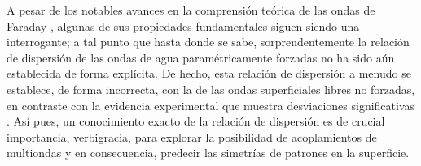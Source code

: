 A pesar de los notables avances en la comprensión teórica de las ondas de Faraday \cite{miles1999faraday, mancebo2004standing}, algunas de sus propiedades fundamentales siguen siendo una interrogante; a tal punto que hasta donde se sabe, sorprendentemente la relación de dispersión de las ondas de agua paramétricamente forzadas no ha sido aún establecida de forma explícita. De hecho, esta relación de dispersión a menudo se establece, de forma incorrecta, con la de las ondas superficiales libres no forzadas, en contraste con la evidencia experimental que muestra desviaciones significativas \cite{edwards1994patterns}. Así pues, un conocimiento exacto de la relación de dispersión es de crucial importancia, verbigracia, para explorar la posibilidad de acoplamientos de multiondas y en consecuencia, predecir las simetrías de patrones en la superficie. \medskip \bigskip
























